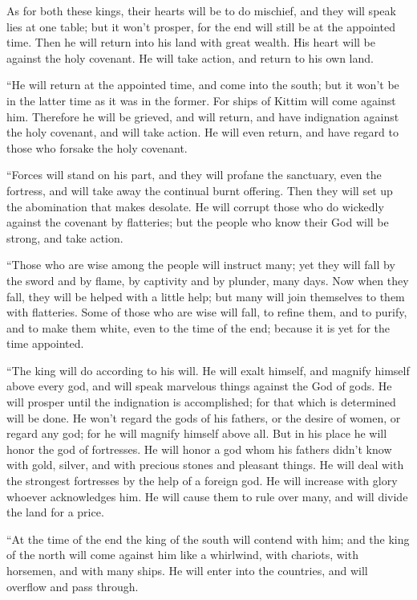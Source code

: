 {As for both these kings, their hearts will be to do mischief, and they will speak lies at one table; but it won’t prosper, for the end will still be at the appointed time.
Then he will return into his land with great wealth. His heart will be against the holy covenant. He will take action, and return to his own land.
\par }{\PP {}“He will return at the appointed time, and come into the south; but it won’t be in the latter time as it was in the former.
For ships of Kittim will come against him. Therefore he will be grieved, and will return, and have indignation against the holy covenant, and will take action. He will even return, and have regard to those who forsake the holy covenant.
\par }{\PP {}“Forces will stand on his part, and they will profane the sanctuary, even the fortress, and will take away the continual burnt offering. Then they will set up the abomination that makes desolate.
He will corrupt those who do wickedly against the covenant by flatteries; but the people who know their God will be strong, and take action.
\par }{\PP {}“Those who are wise among the people will instruct many; yet they will fall by the sword and by flame, by captivity and by plunder, many days.
Now when they fall, they will be helped with a little help; but many will join themselves to them with flatteries.
Some of those who are wise will fall, to refine them, and to purify, and to make them white, even to the time of the end; because it is yet for the time appointed.
\par }{\PP {}“The king will do according to his will. He will exalt himself, and magnify himself above every god, and will speak marvelous things against the God of gods. He will prosper until the indignation is accomplished; for that which is determined will be done.
He won’t regard the gods of his fathers, or the desire of women, or regard any god; for he will magnify himself above all.
But in his place he will honor the god of fortresses. He will honor a god whom his fathers didn’t know with gold, silver, and with precious stones and pleasant things.
He will deal with the strongest fortresses by the help of a foreign god. He will increase with glory whoever acknowledges him. He will cause them to rule over many, and will divide the land for a price.
\par }{\PP {}“At the time of the end the king of the south will contend with him; and the king of the north will come against him like a whirlwind, with chariots, with horsemen, and with many ships. He will enter into the countries, and will overflow and pass through.
}
